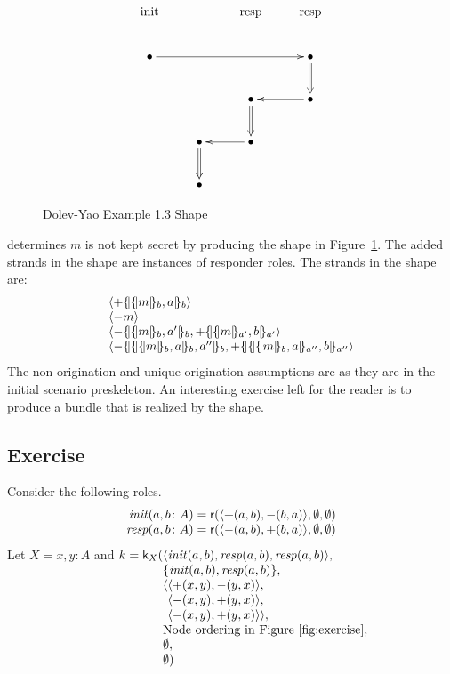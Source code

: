 \documentclass[12pt]{article}
\theoremstyle{definition}
\newcommand{\role}{\mathsf{r}}
\newcommand{\skel}{\mathsf{k}}
\newcommand{\init}{\fn{init}}
\newcommand{\resp}{\fn{resp}}
\begin{document}
\begin{figure}
$$\xymatrix{
\txt{\strut init}&\txt{\strut }&\txt{\strut resp}&\txt{\strut resp}\\
\bullet\ar[rrr]&&&\bullet\ar@{=>}[d]\\
&&\bullet\ar@{=>}[d]&\bullet\ar[l]\\
&\bullet\ar@{=>}[d]&\bullet\ar[l]&\\
&\bullet&&}$$
\caption{Dolev-Yao Example 1.3 Shape}\label{fig:dy shape}
\end{figure}

{\cpsa} determines $m$ is not kept secret by producing the shape in
Figure~\ref{fig:dy shape}.  The added strands in the shape are
instances of responder roles.  The strands in the shape are:
$$\begin{array}{l}
\seq{\outbnd\enc{\enc{m}{b},a}{b}}\\
\seq{\inbnd m}\\
\seq{\inbnd\enc{\enc{m}{b},a'}{b},\outbnd\enc{\enc{m}{a'},b}{a'}}\\
\seq{\inbnd\enc{\enc{\enc{m}{b}, a}{b},a''}{b},
\outbnd\enc{\enc{\enc{m}{b},a}{a''},b}{a''}}
\end{array}$$
The non-origination and unique origination assumptions are as they are
in the initial scenario preskeleton.  An interesting exercise left for
the reader is to produce a bundle that is realized by the shape.

\subsection{Exercise}

Consider the following roles.
$$\begin{array}{r@{{}={}}l}
\init(a,b\colon A)&\role(\seq{\outbnd(a,b),\inbnd(b,a)},
\emptyset,\emptyset)\\
\resp(a,b\colon A)&\role(\seq{\inbnd(a,b),\outbnd(b,a)},
\emptyset,\emptyset)
\end{array}$$
Let $X=x,y\colon A$ and
$\begin{array}[t]{@{}r@{}l}
k=\skel_X(
&\seq{\init(a,b),\resp(a,b),\resp(a,b)},\\
&\{\init(a,b),\resp(a,b)\},\\
&\seq{\begin{array}[t]{@{}l}
\seq{\outbnd(x,y),\inbnd(y,x)},\\
\seq{\inbnd(x,y),\outbnd(y,x)},\\
\seq{\inbnd(x,y),\outbnd(y,x)}},
\end{array}\\
&\mbox{Node ordering in Figure~\ref{fig:exercise}},\\
&\emptyset,\\
&\emptyset)
\end{array}$
\end{document}
